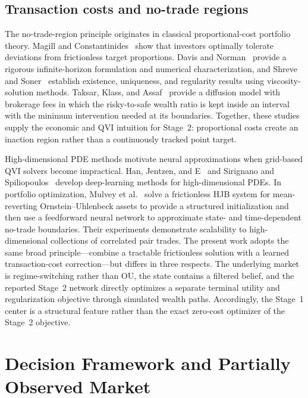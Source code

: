 \documentclass[a4paper,10pt]{article}
\begin{document}
\subsection{Transaction costs and no-trade regions}

The no-trade-region principle originates in classical proportional-cost portfolio theory. Magill and Constantinides~\cite{magill1976} show that investors optimally tolerate deviations from frictionless target proportions. Davis and Norman~\cite{davisnorman1990} provide a rigorous infinite-horizon formulation and numerical characterization, and Shreve and Soner~\cite{shrevesoner1994} establish existence, uniqueness, and regularity results using viscosity-solution methods. Taksar, Klass, and Assaf~\cite{taksar1988} provide a diffusion model with brokerage fees in which the risky-to-safe wealth ratio is kept inside an interval with the minimum intervention needed at its boundaries. Together, these studies supply the economic and QVI intuition for Stage~2: proportional costs create an inaction region rather than a continuously tracked point target.

High-dimensional PDE methods motivate neural approximations when grid-based QVI solvers become impractical. Han, Jentzen, and E~\cite{han2018} and Sirignano and Spiliopoulos~\cite{sirignano2018} develop deep-learning methods for high-dimensional PDEs. In portfolio optimization, Mulvey et al.~\cite{mulvey2020} solve a frictionless HJB system for mean-reverting Ornstein--Uhlenbeck assets to provide a structured initialization and then use a feedforward neural network to approximate state- and time-dependent no-trade boundaries. Their experiments demonstrate scalability to high-dimensional collections of correlated pair trades. The present work adopts the same broad principle---combine a tractable frictionless solution with a learned transaction-cost correction---but differs in three respects. The underlying market is regime-switching rather than OU, the state contains a filtered belief, and the reported Stage~2 network directly optimizes a separate terminal utility and regularization objective through simulated wealth paths. Accordingly, the Stage~1 center is a structural feature rather than the exact zero-cost optimizer of the Stage~2 objective.

\section{Decision Framework and Partially Observed Market}
\end{document}
